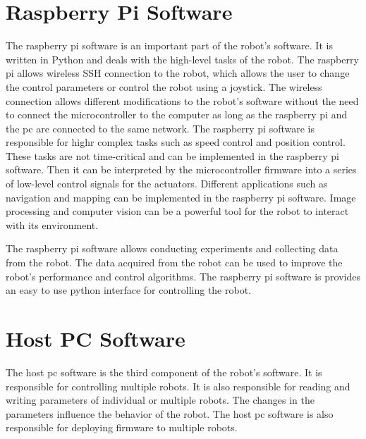 \section{Raspberry Pi Software}
The raspberry pi software is an important part of the robot's software.
It is written in Python and deals with the high-level tasks of the robot.
The raspberry pi allows wireless SSH connection to the robot, which allows the user to change the control parameters or control the robot using a joystick.
The wireless connection allows different modifications to the robot's software without the need to connect the microcontroller to the computer as long as the raspberry pi and the pc are connected to the same network.
The raspberry pi software is responsible for highr complex tasks such as speed control and position control.
These tasks are not time-critical and can be implemented in the raspberry pi software.
Then it can be interpreted by the microcontroller firmware into a series of low-level control signals for the actuators.
Different applications such as navigation and mapping can be implemented in the raspberry pi software.
Image processing and computer vision can be a powerful tool for the robot to interact with its environment.

The raspberry pi software allows conducting experiments and collecting data from the robot.
The data acquired from the robot can be used to improve the robot's performance and control algorithms.
The raspberry pi software is provides an easy to use python interface for controlling the robot.


\section{Host PC Software}
The host pc software is the third component of the robot's software.
It is responsible for controlling multiple robots.
It is also responsible for reading and writing parameters of individual or multiple robots.
The changes in the parameters influence the behavior of the robot.
The host pc software is also responsible for deploying firmware to multiple robots.
